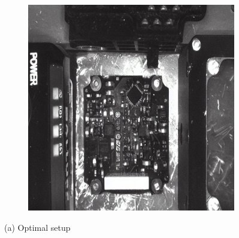 \documentclass[12pt,DIV14,BCOR12mm,a4paper,footinclude=false,headinclude,parskip=half-,twoside,openright,cleardoublepage=empty,toc=index,bibliography=totoc,listof=totoc]{scrreprt}
\numberwithin{equation}{chapter}
\begin{document}
\begin{figure}
\begin{subfigure}[t]{0.45\textwidth}
        \includegraphics[width=\textwidth]{../media/diff_pcb_optimal_fake.png}
    \end{subfigure}
    \caption*{(a) Optimal setup}

    \vspace{0.3cm} %


\end{figure}
\end{document}

